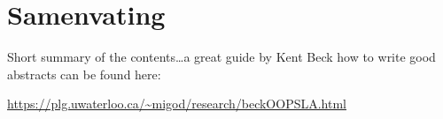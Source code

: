 


\begingroup
\let\clearpage\relax
\let\cleardoublepage\relax
\let\cleardoublepage\relax

\chapter*{Samenvating}
Short summary of the contents\dots a great guide by
Kent Beck how to write good abstracts can be found here:
\begin{center}
\url{https://plg.uwaterloo.ca/~migod/research/beckOOPSLA.html}
\end{center}

\endgroup

\vfill
